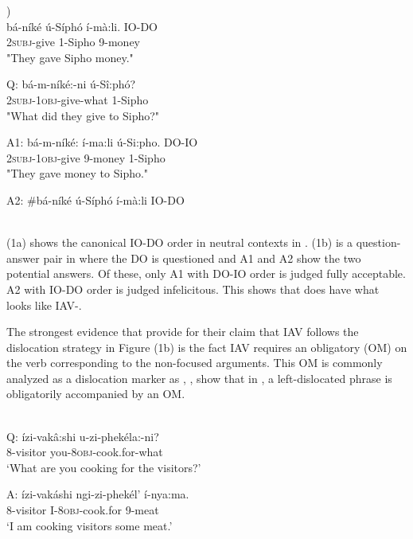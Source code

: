 \documentclass[output=paper
,newtxmath
,modfonts
,nonflat]{langsci/langscibook}
\begin{document}
\ea\label{ex:selvanathan:1}
 \citep[2]{chengdowning2012})\\

\ea\label{ex:selvanathan:1a}
\gll bá-níké   ú-Síphó  í-mà:li.       IO-DO \\
\textsc{2subj}{}-give  1-Sipho     9-money {} \\
\glt "They gave Sipho money." 

\ex\label{ex:selvanathan:1b}
	Q: \gll bá-m-níké:-ni      ú-Sî:phó? \\
	\textsc{2subj}{}-\textsc{1obj}{}-give-what    1-Sipho \\
	\glt "What did they give to Sipho?"

	A1: \gll bá-m-níké:      í-ma:li   ú-Si:pho.    DO-IO \\
	\textsc{2subj}{}-\textsc{1obj}{}-give   9-money   1-Sipho \\
	\glt "They gave money to Sipho." 

	A2: \gll \#bá-níké   ú-Síphó  í-mà:li    IO-DO \\
	\\
\z
\z

(1a) shows the canonical IO-DO order in neutral contexts in . (1b) is a question-answer pair in  where the DO is questioned and A1 and A2 show the two potential answers. Of these, only A1 with DO-IO order is judged fully acceptable. A2 with IO-DO order is judged infelicitous. This shows that  does have what looks like IAV-. 

The strongest evidence that \citet{chengdowning2012} provide for their claim that  IAV  follows the dislocation strategy in Figure (1b) is the fact  IAV requires an obligatory  (OM) on the verb corresponding to the non-focused arguments. This OM is commonly analyzed as a dislocation marker as \citet{vanderSpuy1993}, \citet{Buell2005,Buell2006}, \citet{Halpert2012} show that in , a left-dislocated phrase is obligatorily accompanied by an OM.

\ea\label{ex:selvanathan:2}
\\
Q: \gll ízi-vakâ:shi  u-zi-phekéla:-ni? \\
	8-visitor      you-\textsc{8obj}{}-cook.for-what \\
\glt \-\hspace{0.5cm}`What are you cooking for the visitors?' 

A: \gll  ízi-vakáshi    ngi-zi-phekél’    í-nya:ma.\\
	8-visitor      I-\textsc{8obj}{}-cook.for    9-meat\\
\glt \-\hspace{0.5cm}`I am cooking visitors some meat.'
\z
\end{document}
